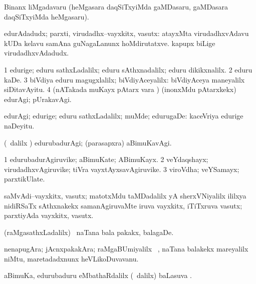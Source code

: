 \noindent
\gl{\pagu}
\bmng
{} Binanx liMgadavaru (heMgasara daqSiTxyiMda gaMDasaru, gaMDasara daqSiTxyiMda heMgasaru). 
\emng
\eentry

\bentry
{}
\gl{\nA}
\bmng
edurAdadudx; parxti, virudadhx--vayxkitx, vasutx:  atayxMta virudadhxvAdavu kUDa kelavu samAna guNagaLanunx hoMdirutatxve.  kapupx biLige virudadhxvAdadudx. 
\emng
\eentry

\bentry
{}
\gl{\kirxvi}
\bmng
\bnum
\num{1} edurige; eduru sathxLadalilx; eduru sAthxnadalilx; eduru dikikxnalilx. 
\num{2} eduru kaDe. 
\num{3} biVdiya eduru magugxlalilx; biVdiyAceyalilx:  biVdiyAceya maneyalilx siDitavAyitu. 
\num{4} (nATakada muKayx pAtarx \mo vara \vi) (inonxMdu pAtarxkekx) edurAgi; pUrakavAgi. 
\enum
\emng
\eentry

\bentry
{}
\gl{\upa}
\bmng
edurAgi; edurige; eduru sathxLadalilx; muMde; edurugaDe:  kaceVriya edurige naDeyitu. 
\emng
\eentry

\bentry
{}
\gl{\kirxvi}
\bmng
(\kanmu\ \savi dalilx \parx) edurubadurAgi; (parasapxra) aBimuKavAgi. 
\emng
\eentry

\bentry
{}
\gl{\nA}
\bmng
\bnum
\num{1} edurubadurAgiruvike; aBimuKate; ABimuKayx. 
\num{2} veYdaqshayx; virudadhxvAgiruvike; tiVra vayxtAyxsavAgiruvike. 
\num{3} viroVdha; veYSamayx; parxtikUlate. 
\enum
\emng
\eentry

\bentry
{}
\gl{\nA}
\bmng
saMvAdi--vayxkitx, vasutx; matotxMdu taMDadalilx yA sherxVNiyalilx ililxya nidiRSaTx sAthxnakekx samanAgiruvaMte iruva vayxkitx, iTiTxruva vasutx; parxtiyAda vayxkitx, vasutx. 
\emng
\eentry

\bentry
{}
\gl{\nA}
\bmng
(raMgasathxLadalilx) \sA\ naTana bala pakakx, balagaDe. 
\emng
\eentry

\bentry
{}
\gl{\nA}
\bmng
nenapugAra; jAcnxpakakAra; raMgaBUmiyalilx \sA\ , naTana balakekx mareyalilx niMtu, maretadadxnunx heVLikoDuvavanu. 
\emng
\eentry

\bentry
{}
\gl{\sapUpa}
\bmng
aBimuKa, edurubaduru eMbathaRdalilx (\kanmu\ \savi dalilx) baLasuva \sapUpa. 
\emng
\eentry

